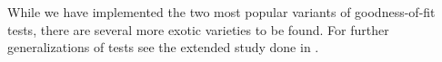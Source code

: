 While we have implemented the two most popular variants of goodness-of-fit tests, there are 
several more exotic varieties to be found. For further generalizations of tests see the extended study done in \cite{dewev1973}.


%



\address{Taylor B. Arnold \\
Yale University\\
24 Hillhouse Ave. \\
New Haven, CT 06511
USA\\
}

\address{John W. Emerson \\
Yale University\\
24 Hillhouse Ave. \\
New Haven, CT 06511
USA\\
}

